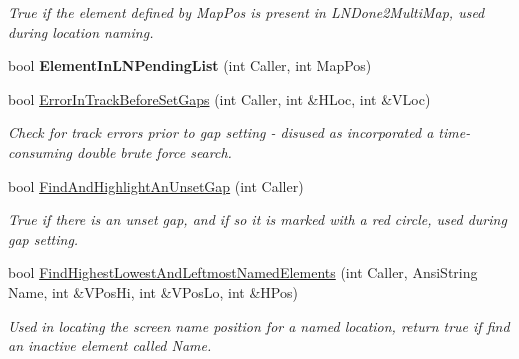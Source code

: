 \begin{DoxyCompactItemize}
\begin{DoxyCompactList}\small\item\em True if the element defined by Map\+Pos is present in L\+N\+Done2\+Multi\+Map, used during location naming. \end{DoxyCompactList}\item 
\mbox{\label{class_t_track_a977285544a4e0b017ed5c9670ac38d87}} 
bool {\bfseries Element\+In\+L\+N\+Pending\+List} (int Caller, int Map\+Pos)
\item 
\mbox{\label{class_t_track_a110a199a0c3fd6d2b8fa1cebc0a0a4ed}} 
bool \mbox{\hyperlink{class_t_track_a110a199a0c3fd6d2b8fa1cebc0a0a4ed}{Error\+In\+Track\+Before\+Set\+Gaps}} (int Caller, int \&H\+Loc, int \&V\+Loc)
\begin{DoxyCompactList}\small\item\em Check for track errors prior to gap setting -\/ disused as incorporated a time-\/consuming double brute force search. \end{DoxyCompactList}\item 
\mbox{\label{class_t_track_a411cfd944b75372ae56937d69fb8b1c5}} 
bool \mbox{\hyperlink{class_t_track_a411cfd944b75372ae56937d69fb8b1c5}{Find\+And\+Highlight\+An\+Unset\+Gap}} (int Caller)
\begin{DoxyCompactList}\small\item\em True if there is an unset gap, and if so it is marked with a red circle, used during gap setting. \end{DoxyCompactList}\item 
\mbox{\label{class_t_track_aabdf6becaf1d21cc5c654293cc3fc734}} 
bool \mbox{\hyperlink{class_t_track_aabdf6becaf1d21cc5c654293cc3fc734}{Find\+Highest\+Lowest\+And\+Leftmost\+Named\+Elements}} (int Caller, Ansi\+String Name, int \&V\+Pos\+Hi, int \&V\+Pos\+Lo, int \&H\+Pos)
\begin{DoxyCompactList}\small\item\em Used in locating the screen name position for a named location, return true if find an inactive element called \textquotesingle{}Name\textquotesingle{}. \end{DoxyCompactList}\item 
\mbox{\label{class_t_track_ad55e3329a208e84e9e7519cc024b7aec}} 

\end{DoxyCompactItemize}
